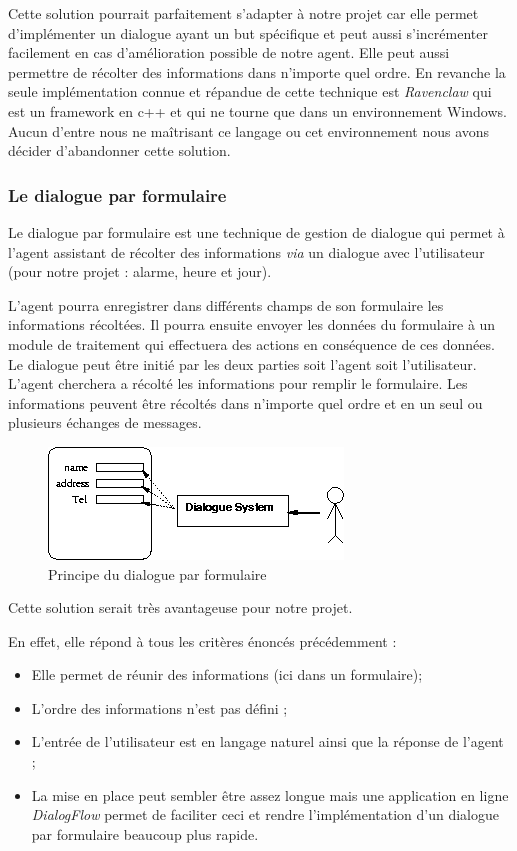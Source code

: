 \FloatBarrier

Cette solution pourrait parfaitement s'adapter à notre projet car elle permet d'implémenter un dialogue ayant un but spécifique et peut aussi s'incrémenter facilement en cas d'amélioration possible de notre agent. Elle peut aussi permettre de récolter des informations dans n'importe quel ordre. En revanche la seule implémentation connue et répandue de cette technique est \textit{Ravenclaw} qui est un framework en c++ et qui ne tourne que dans un environnement Windows. Aucun d'entre nous ne maîtrisant ce langage ou cet environnement nous avons décider d'abandonner cette solution. 

\subsubsection{Le dialogue par formulaire}
Le dialogue par formulaire est une technique de gestion de dialogue qui permet à l'agent assistant de récolter des informations \emph{via} un dialogue avec l'utilisateur (pour notre projet : alarme, heure et jour). 

L'agent pourra enregistrer dans différents champs de son formulaire les informations récoltées. Il pourra ensuite envoyer les données du formulaire à un module de traitement qui effectuera des actions en conséquence de ces données. Le dialogue peut être initié par les deux parties soit l'agent soit l'utilisateur. L'agent cherchera a récolté les informations pour remplir le formulaire. Les informations peuvent être récoltés dans n'importe quel ordre et en un seul ou plusieurs échanges de messages.

\begin{figure}[H]
\centering
    \includegraphics[scale=0.7]{images/slot.png} %
    \caption{Principe du dialogue par formulaire}
\end{figure}

Cette solution serait très avantageuse pour notre projet. 

En effet, elle répond à tous les critères énoncés précédemment : 
\begin{itemize}
    \item Elle permet de réunir des informations (ici dans un formulaire);
    \item L'ordre des informations n'est pas défini ;
    \item L'entrée de l'utilisateur est en langage naturel ainsi que la réponse de l'agent ;
    \item La mise en place peut sembler être assez longue mais une application en ligne \textit{DialogFlow} permet de faciliter ceci et rendre l'implémentation d'un dialogue par formulaire beaucoup plus rapide.
\end{itemize}
\FloatBarrier


